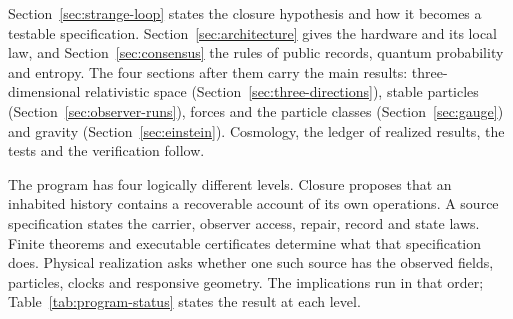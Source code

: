 \documentclass[11pt]{article}
\theoremstyle{definition}
\theoremstyle{remark}
\begin{document}
Section~\ref{sec:strange-loop} states the closure hypothesis and how it
becomes a testable specification. Section~\ref{sec:architecture} gives
the hardware and its local law, and Section~\ref{sec:consensus} the
rules of public records, quantum probability and entropy. The four
sections after them carry the main results:
three-dimensional relativistic space (Section~\ref{sec:three-directions}),
stable particles (Section~\ref{sec:observer-runs}), forces and the
particle classes (Section~\ref{sec:gauge}) and gravity
(Section~\ref{sec:einstein}). Cosmology, the ledger of realized results,
the tests and the verification follow.

The program has four logically different levels. Closure proposes that an
inhabited history contains a recoverable account of its own operations. A
source specification states the carrier, observer access, repair, record and
state laws. Finite theorems and executable certificates determine what that
specification does. Physical realization asks whether one such source has
the observed fields, particles, clocks and responsive geometry. The
implications run in that order; Table~\ref{tab:program-status} states the
result at each level.
\end{document}
